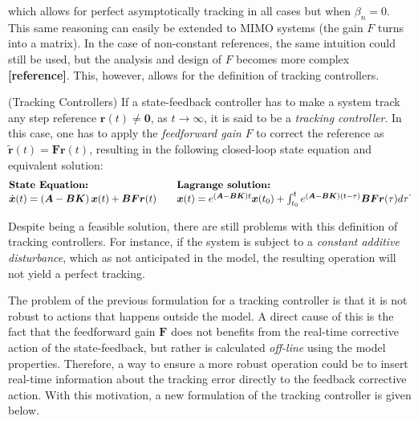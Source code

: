 \documentclass[a4paper,11pt]{book}
\numberwithin{figure}{chapter}
\numberwithin{equation}{chapter}
\numberwithin{table}{chapter}
\theoremstyle{definition}
\newtheorem{definition}{Definition}[chapter]
\newcounter{boxed-theorem}
\newcounter{boxed-definition}
\newenvironment{boxed-definition}[1]
{\begin{shaded} \begin{definition}{#1}}
{\end{definition} \end{shaded}}
\begin{document}
\noindent which allows for perfect asymptotically tracking in all cases but when $\beta_n = 0$. This same reasoning can easily be extended to MIMO systems (the gain $F$ turns into a matrix). In the case of non-constant references, the same intuition could still be used, but the analysis and design of $F$ becomes more complex \textbf{[reference]}. This, however, allows for the definition of tracking controllers.

\begin{boxed-definition}{(Tracking Controllers)} \label{def:tracking}
    If a state-feedback controller has to make a system track any step reference $\bm{r}(t) \neq \bm{0}$, as $t \to \infty$, it is said to be a \textit{tracking controller}. In this case, one has to apply the \textit{feedforward gain} $F$ to correct the reference as $\tilde{\bm{r}}(t) = \bm{F}\bm{r}(t)$, resulting in the following closed-loop state equation and equivalent solution:
    \begin{align}
    \begin{matrix*}[l]
    \textbf{State Equation:} \hfill & & \textbf{Lagrange solution:} \hfill \\
    \dot{\bm{x}}(t) = \left( \bm{A} - \bm{B} \bm{K} \right) \bm{x}(t) + \bm{B} \bm{F} \bm{r}(t)  & &
    \bm{x}(t) = e^{(\bm{A} - \bm{B} \bm{K}) t} \bm{x}(t_0) + \int_{t_0}^{t} e^{(\bm{A} - \bm{B} \bm{K}) (t - \tau)} \bm{B} \bm{F} \bm{r}(\tau) d \tau \hfill
    \end{matrix*}
    .\end{align}
\end{boxed-definition}

Despite being a feasible solution, there are still problems with this definition of tracking controllers. For instance, if the system is subject to a \textit{constant additive disturbance}, which as not anticipated in the model, the resulting operation will not yield a perfect tracking. 

The problem of the previous formulation for a tracking controller is that it is not robust to actions that happens outside the model. A direct cause of this is the fact that the feedforward gain $\bm{F}$ does not benefits from the real-time corrective action of the state-feedback, but rather is calculated \textit{off-line} using the model properties. Therefore, a way to ensure a more robust operation could be to insert real-time information about the tracking error directly to the feedback corrective action. With this motivation, a new formulation of the tracking controller is given below.
\end{document}
